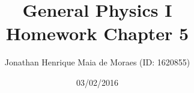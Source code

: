 \title{General Physics I \\ Homework Chapter 5}
\author{Jonathan Henrique Maia de Moraes (ID: 1620855)}
\date{03/02/2016}
\maketitle
